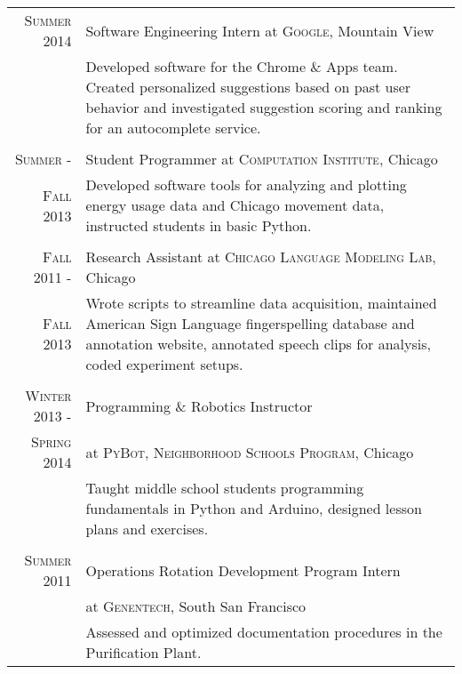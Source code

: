 \documentclass[a4paper,10pt]{article} %
\begin{document}
\begin{tabular}{r|p{11cm}}
\textsc{Summer 2014}  & Software Engineering Intern at \textsc{Google}, Mountain View\\
& \footnotesize{Developed software for the Chrome \& Apps team. Created personalized suggestions based on past user behavior and investigated suggestion scoring and ranking for an autocomplete service.}\\
\multicolumn{2}{c}{} \\


\textsc{Summer -} & Student Programmer at \textsc{Computation Institute}, Chicago\\
\textsc{Fall 2013} & \footnotesize{Developed software tools for analyzing and plotting energy usage data and Chicago movement data, instructed students in basic Python.}\\
\multicolumn{2}{c}{} \\


\textsc{Fall 2011 -} & Research Assistant at \textsc{Chicago Language Modeling Lab}, Chicago \emph{}\\
\textsc{Fall 2013} & \footnotesize{Wrote scripts to streamline data acquisition, maintained American Sign Language fingerspelling database and annotation website, annotated speech clips for analysis, coded experiment setups.} \\
\multicolumn{2}{c}{} \\


\textsc{Winter 2013 -} & Programming \& Robotics Instructor\\ 
\textsc{Spring 2014} & at \textsc{PyBot, Neighborhood Schools Program}, Chicago\\
& \footnotesize{Taught middle school students programming fundamentals in Python and Arduino, designed lesson plans and exercises.} \\
\multicolumn{2}{c}{} \\

\textsc{Summer 2011} & Operations Rotation Development Program Intern\\ 
& at \textsc{Genentech}, South San Francisco\\
& \footnotesize{Assessed and optimized documentation procedures in the Purification Plant.}
\end{tabular}
\end{document}
